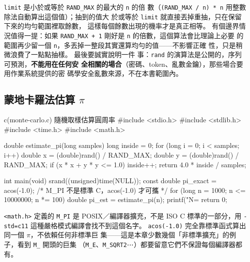 
\texttt{limit} 是小於或等於 \texttt{RAND\_MAX} 的最大的 \texttt{n} 的倍
數（\texttt{(RAND\_MAX / n) * n} 用整數除法自動算出這個值）；抽到的值大
於或等於 \texttt{limit} 就直接丟掉重抽，只在保留下來的均勻範圍裡取餘數，
這樣每個餘數出現的機率才是真正相等。 有個邊界情況值得一提：如果
\texttt{RAND\_MAX + 1} 剛好是 \texttt{n} 的倍數，這個算法會比理論上必要
的範圍再少留一個 \texttt{n}，多丟掉一整段其實還算均勻的值——不影響正確
性，只是稍微浪費了一點點抽樣。 最後要誠實說明一件
事：\texttt{rand} 的演算法是公開的，序列可預測，\textbf{不能用在任何安
全相關的場合}（密碼、token、亂數金鑰），那些場合要用作業系統提供的密
碼學安全亂數來源，不在本書範圍內。

\subsection{蒙地卡羅法估算 $\pi$}

\begin{example}{c}{(monte-carlo.c) 隨機取樣估算圓周率}
#include <stdio.h>
#include <stdlib.h>
#include <time.h>
#include <math.h>

double estimate_pi(long samples) {
    long inside = 0;
    for (long i = 0; i < samples; i++) {
        double x = (double)rand() / RAND_MAX;
        double y = (double)rand() / RAND_MAX;
        if (x * x + y * y <= 1.0) inside++;
    }
    return 4.0 * inside / samples;
}

int main(void) {
    srand((unsigned)time(NULL));
    const double pi_exact = acos(-1.0); /* M_PI 不是標準 C，acos(-1.0) 才可攜 */
    for (long n = 1000; n <= 10000000; n *= 100) {
        double pi_est = estimate_pi(n);
        printf("N=%
    }
    return 0;
}
\end{example}

\texttt{<math.h>} 定義的 \texttt{M\_PI} 是 POSIX／編譯器擴充，不是 ISO C
標準的一部分，用 \texttt{-std=c11} 這種嚴格模式編譯會找不到這個名字。
\texttt{acos(-1.0)} 完全靠標準函式算出同一個 $\pi$，不依賴任何非標準巨
集——這是本章少數幾個「非標準擴充」的例子，看到 \texttt{M\_} 開頭的巨集
（\texttt{M\_E}、\texttt{M\_SQRT2}⋯）都要留意它們不保證每個編譯器都有。


